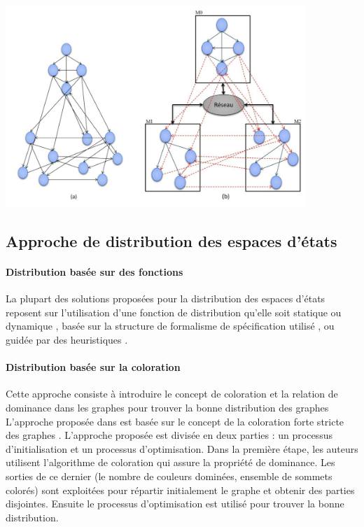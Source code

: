 \begin{center}
		\includegraphics[height=3in]{img/eed.png}		
		 \label{eed}
\end{center}

\subsection*{Approche de distribution des espaces d'états}
\paragraph{Distribution basée sur des fonctions}
 La plupart des solutions proposées pour la distribution des espaces d'états reposent sur l'utilisation d'une fonction de distribution qu'elle soit statique \citep{Garavel2013}ou dynamique \citep{Allmaier1997}, basée sur la structure de formalisme de spécification utilisé \citep{Ciardo1998}, \citep{BlomOrzan2005} ou guidée par des heuristiques \citep{Rodrigues2006}.
 \paragraph{Distribution basée sur la coloration}
 Cette approche consiste à introduire le concept de coloration et la relation de dominance dans les graphes pour trouver la bonne distribution des graphes L'approche proposée dans \citep{Guidoum2013} est basée sur le concept de la coloration forte stricte des graphes \citep{Bouzenada2012}. L'approche proposée est divisée en deux parties : un processus d'initialisation et un processus d'optimisation. Dans la première étape, les auteurs utilisent l'algorithme de coloration \citep{Bouzenada2012} qui assure la propriété de dominance. Les sorties de ce dernier (le nombre de couleurs dominées, ensemble de sommets colorés) sont exploitées pour répartir initialement le graphe et obtenir des parties disjointes. Ensuite le processus d'optimisation est utilisé pour trouver la bonne distribution.
 
